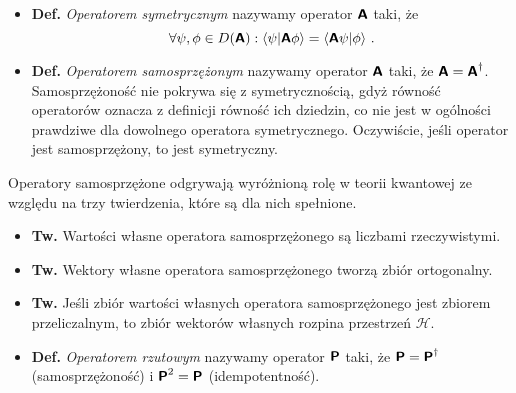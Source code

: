 \documentclass{myclass}
\begin{document}
\begin{itemize}

    \item \textbf{Def.} \textit{Operatorem symetrycznym} nazywamy operator \(\boldsymbol{\mathsf{A}}\) taki, że
    \begin{equation*}
        \forall \psi,\phi \in D(\boldsymbol{\mathsf{A}}) : \braket{\psi}{\boldsymbol{\mathsf{A}}\phi} = \braket{\boldsymbol{\mathsf{A}}\psi}{\phi}\,.
    \end{equation*}

    \item \textbf{Def.} \textit{Operatorem samosprzężonym} nazywamy operator \(\boldsymbol{\mathsf{A}}\) taki, że
    \(\boldsymbol{\mathsf{A}} = \boldsymbol{\mathsf{A}}^\dagger\). Samosprzężoność nie pokrywa się z symetrycznością, gdyż równość
    operatorów oznacza z definicji równość ich dziedzin, co nie jest w ogólności prawdziwe dla
    dowolnego operatora symetrycznego. Oczywiście, jeśli operator jest samosprzężony, to jest
    symetryczny.

\end{itemize}

Operatory samosprzężone odgrywają wyróżnioną rolę w teorii kwantowej ze względu na trzy twierdzenia,
które są dla nich spełnione.
\begin{itemize}
    
    \item \textbf{Tw.} Wartości własne operatora samosprzężonego są liczbami rzeczywistymi.

    \item \textbf{Tw.} Wektory własne operatora samosprzężonego tworzą zbiór ortogonalny.

    \item \textbf{Tw.} Jeśli zbiór wartości własnych operatora samosprzężonego jest zbiorem
    przeliczalnym, to zbiór wektorów własnych rozpina przestrzeń \(\mathscr{H}\).

\end{itemize}

\begin{itemize}

    \item \textbf{Def.} \textit{Operatorem rzutowym} nazywamy operator \(\boldsymbol{\mathsf{P}}\) taki, że
    \(\boldsymbol{\mathsf{P}} = \boldsymbol{\mathsf{P}}^\dagger\) (samosprzężoność) i \(\boldsymbol{\mathsf{P}}^2 = \boldsymbol{\mathsf{P}}\) (idempotentność).

\end{itemize}
\end{document}
